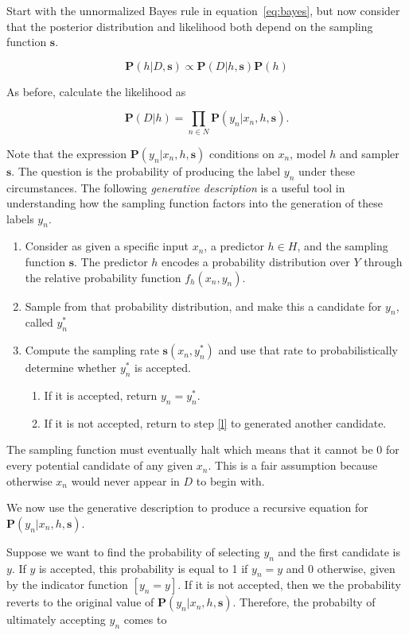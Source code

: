 \documentclass[twoside]{article}
\begin{document}
Start with the unnormalized Bayes rule in equation~\eqref{eq:bayes}, but now consider that the posterior distribution and likelihood both depend on the sampling function \(\mathbf{s}\).

\[\mathbf{P}(h|D,\mathbf{s})\propto\mathbf{P}(D|h,\mathbf{s})\mathbf{P}(h)\]

As before, calculate the likelihood as

\[\mathbf{P}(D|h)=\prod_{n \in N} \mathbf{P}(y_n|x_n,h,\mathbf{s}).\]

Note that the expression \(\mathbf{P}(y_n|x_n,h,\mathbf{s})\) conditions on \(x_n\), model \(h\) and sampler \(\mathbf{s}\). The question is the probability of producing the label \(y_n\) under these circumstances. The following \textit{generative description} is a useful tool in understanding how the sampling function factors into the generation of these labels \(y_n\).

\begin{enumerate}
	\item Consider as given a specific input \(x_n\), a predictor \(h \in H\), and the sampling function \(\mathbf{s}\). The predictor \(h\) encodes a probability distribution over \(Y\) through the relative probability function \(f_h(x_n,y_n)\).
	\item \label{l} Sample from that probability distribution, and make this a candidate for \(y_n\), called \(y_n^*\)
	\item Compute the sampling rate \(\mathbf{s}(x_n,y_n^*)\) and use that rate to probabilistically determine whether \(y_n^*\) is accepted.
    \begin{enumerate}
        \item If it is accepted, return \(y_n=y_n^*\).
        \item If it is not accepted, return to step \ref{l} to generated another candidate.
    \end{enumerate}
\end{enumerate}

The sampling function must eventually halt which means that it cannot be 0 for every potential candidate of any given \(x_n\). This is a fair assumption because otherwise \(x_n\) would never appear in \(D\) to begin with.

We now use the generative description to produce a recursive equation for \(\mathbf{P}(y_n|x_n,h,\mathbf{s})\).

Suppose we want to find the probability of selecting \(y_n\) and the first candidate is \(y\). If \(y\) is accepted, this probability is equal to 1 if \(y_n = y\) and 0 otherwise, given by the indicator function \(\left [y_n = y\right ]\). If it is not accepted, then we the probability reverts to the original value of \(\mathbf{P}(y_n|x_n,h,\mathbf{s})\). Therefore, the probabilty of ultimately accepting \(y_n\) comes to
\end{document}
